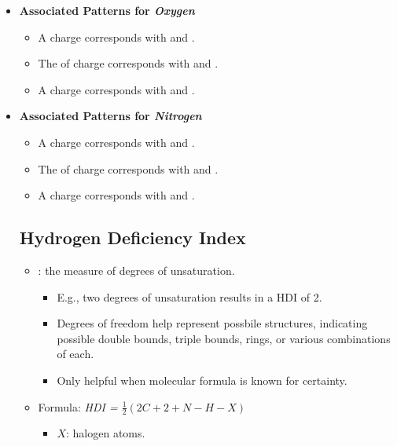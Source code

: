 \documentclass{inVerba-notes}
\begin{document}
    \begin{itemize}
        \item \textbf{Associated Patterns for \emph{Oxygen}}
            \begin{itemize}
                \item A  charge corresponds with  and .
                \item The  of charge corresponds with  and .
                \item A  charge corresponds with  and .
            \end{itemize}
        \item \textbf{Associated Patterns for \emph{Nitrogen}}
            \begin{itemize}
                \item A  charge corresponds with  and .
                \item The  of charge corresponds with  and .
                \item A  charge corresponds with  and .
            \end{itemize}
        \subsection{Hydrogen Deficiency Index} 
            \begin{itemize}
                \item {}: the measure of degrees of unsaturation.
                \begin{itemize}
                    \item E.g., two degrees of unsaturation results in a HDI of 2.
                    \item Degrees of freedom help represent possbile structures, indicating possible double bounds, triple bounds, rings, or various combinations of each.
                    \item Only helpful when molecular formula is known for certainty.
                \end{itemize}
                \item Formula: \emph{HDI = \( \frac{1}{2}(2C + 2 + N - H - X) \)}
                \begin{itemize}
                    \item \(X\): halogen atoms.
            \end{itemize}
        \end{itemize}
    \end{itemize}
\end{document}
